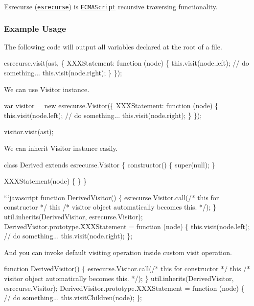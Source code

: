 Esrecurse (\href{https://github.com/estools/esrecurse}{\tt esrecurse}) is \href{https://www.ecma-international.org/publications/standards/Ecma-262.htm}{\tt E\+C\+M\+A\+Script} recursive traversing functionality.

\subsubsection*{Example Usage}

The following code will output all variables declared at the root of a file.


\begin{DoxyCode}
esrecurse.visit(ast, \{
    XXXStatement: function (node) \{
        this.visit(node.left);
        // do something...
        this.visit(node.right);
    \}
\});
\end{DoxyCode}


We can use {\ttfamily Visitor} instance.


\begin{DoxyCode}
var visitor = new esrecurse.Visitor(\{
    XXXStatement: function (node) \{
        this.visit(node.left);
        // do something...
        this.visit(node.right);
    \}
\});

visitor.visit(ast);
\end{DoxyCode}


We can inherit {\ttfamily Visitor} instance easily.


\begin{DoxyCode}
class Derived extends esrecurse.Visitor \{
    constructor()
    \{
        super(null);
    \}

    XXXStatement(node) \{
    \}
\}

```javascript
function DerivedVisitor() \{
    esrecurse.Visitor.call(/* this for constructor */  this  /* visitor object automatically becomes this.
       */);
\}
util.inherits(DerivedVisitor, esrecurse.Visitor);
DerivedVisitor.prototype.XXXStatement = function (node) \{
    this.visit(node.left);
    // do something...
    this.visit(node.right);
\};
\end{DoxyCode}


And you can invoke default visiting operation inside custom visit operation.


\begin{DoxyCode}
function DerivedVisitor() \{
    esrecurse.Visitor.call(/* this for constructor */  this  /* visitor object automatically becomes this.
       */);
\}
util.inherits(DerivedVisitor, esrecurse.Visitor);
DerivedVisitor.prototype.XXXStatement = function (node) \{
    // do something...
    this.visitChildren(node);
\};
\end{DoxyCode}


